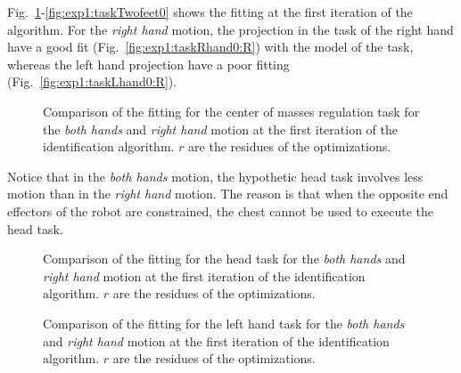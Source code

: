 \documentclass[letterpaper, 10pt, conference]{ieeeconf}      %
\begin{document}
Fig.~\ref{fig:exp1:taskCom0}-\ref{fig:exp1:taskTwofeet0} shows the
fitting at the first iteration of the algorithm. For the \emph{right
hand} motion, the projection in the task of the right hand have a good
fit (Fig.~\ref{fig:exp1:taskRhand0:R}) with the model of the
task, whereas the left hand projection have a poor fitting
(Fig.~\ref{fig:exp1:taskLhand0:R}).


\begin{figure}[t]
  \centering
  \caption{Comparison of the fitting for the center of masses regulation task for the \emph{both hands} and \emph{right hand} motion at the first iteration of the identification algorithm.
  $r$ are the residues of the optimizations.}
  \label{fig:exp1:taskCom0}
\end{figure}

Notice that in the \emph{both hands} motion, the hypothetic head task involves less motion
than in the \emph{right hand} motion. The reason is that when the opposite end effectors
of the robot are constrained, the chest cannot be used to execute the head task.

\begin{figure}[t]
  \centering
  \caption{Comparison of the fitting for the head task for the
  \emph{both hands} and \emph{right hand} motion at the first
  iteration of the identification algorithm.  $r$ are
  the residues of the optimizations.}
  \label{fig:exp1:taskHead0}
\end{figure}

\begin{figure}[t]
  \centering
  \caption{Comparison of the fitting for the left hand task for the
  \emph{both hands} and \emph{right hand} motion at the first
  iteration of the identification algorithm.  $r$ are
  the residues of the optimizations.}
  \label{fig:exp1:taskLhand0}
\end{figure}
\end{document}
